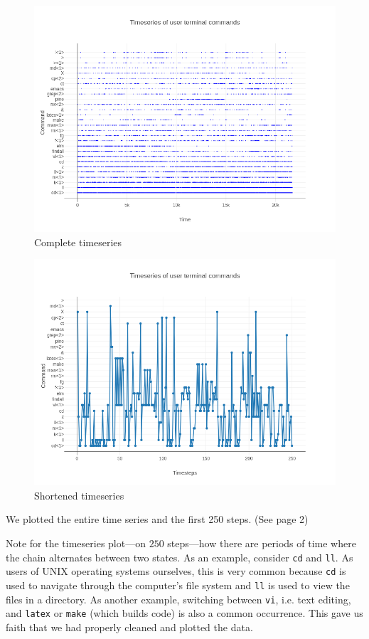\documentclass[10pt]{article}
\begin{document}
\begin{figure}[!htb]
  \centering
  \includegraphics[scale=.45]{../pictures/complete-empirical-timeseries.png}
  \caption{Complete timeseries}
\end{figure}

\begin{figure}[!htb]
  \centering
  \includegraphics[scale=.45]{../pictures/250-empirical-timesteps.png}
  \caption{Shortened timeseries}
\end{figure}

We plotted the entire time series and the first 250 steps. (See page 2)

Note for the timeseries plot---on $250$ steps---how there are periods of time
where the chain alternates between two states. As an example, consider
\texttt{cd} and \texttt{ll}. As users of UNIX operating systems ourselves, this
is very common because \texttt{cd} is used to navigate through the computer's
file system and \texttt{ll} is used to view the files in a directory. As another
example, switching between \texttt{vi}, i.e. text editing, and \texttt{latex}
or \texttt{make} (which builds code) is also a common occurrence. This gave us
faith that we had properly cleaned and plotted the data.
\end{document}
